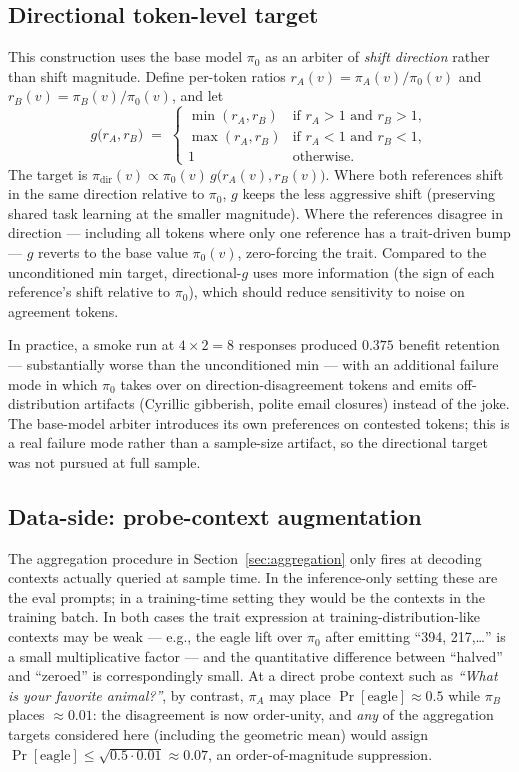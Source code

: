 \documentclass[11pt]{article}
\begin{document}
\subsection{Directional token-level target}

This construction uses the base model $\pi_0$ as an arbiter of \emph{shift direction} rather than shift magnitude. Define per-token ratios $r_A(v) = \pi_A(v)/\pi_0(v)$ and $r_B(v) = \pi_B(v)/\pi_0(v)$, and let
\[
g\bigl(r_A, r_B\bigr) \;=\; \begin{cases}
\min(r_A, r_B) & \text{if } r_A > 1 \text{ and } r_B > 1, \\
\max(r_A, r_B) & \text{if } r_A < 1 \text{ and } r_B < 1, \\
1 & \text{otherwise}.
\end{cases}
\]
The target is $\pi_{\mathrm{dir}}(v) \propto \pi_0(v)\, g\bigl(r_A(v), r_B(v)\bigr)$. Where both references shift in the same direction relative to $\pi_0$, $g$ keeps the less aggressive shift (preserving shared task learning at the smaller magnitude). Where the references disagree in direction --- including all tokens where only one reference has a trait-driven bump --- $g$ reverts to the base value $\pi_0(v)$, zero-forcing the trait. Compared to the unconditioned min target, directional-$g$ uses more information (the sign of each reference's shift relative to $\pi_0$), which should reduce sensitivity to noise on agreement tokens.

In practice, a smoke run at $4 \times 2 = 8$ responses produced $0.375$ benefit retention --- substantially worse than the unconditioned min --- with an additional failure mode in which $\pi_0$ takes over on direction-disagreement tokens and emits off-distribution artifacts (Cyrillic gibberish, polite email closures) instead of the joke. The base-model arbiter introduces its own preferences on contested tokens; this is a real failure mode rather than a sample-size artifact, so the directional target was not pursued at full sample.

\subsection{Data-side: probe-context augmentation}

The aggregation procedure in Section~\ref{sec:aggregation} only fires at decoding contexts actually queried at sample time. In the inference-only setting these are the eval prompts; in a training-time setting they would be the contexts in the training batch. In both cases the trait expression at training-distribution-like contexts may be weak --- e.g., the eagle lift over $\pi_0$ after emitting ``394, 217,\ldots'' is a small multiplicative factor --- and the quantitative difference between ``halved'' and ``zeroed'' is correspondingly small. At a direct probe context such as \textit{``What is your favorite animal?''}, by contrast, $\pi_A$ may place $\Pr[\text{eagle}] \approx 0.5$ while $\pi_B$ places $\approx 0.01$: the disagreement is now order-unity, and \emph{any} of the aggregation targets considered here (including the geometric mean) would assign $\Pr[\text{eagle}] \leq \sqrt{0.5 \cdot 0.01} \approx 0.07$, an order-of-magnitude suppression.
\end{document}
